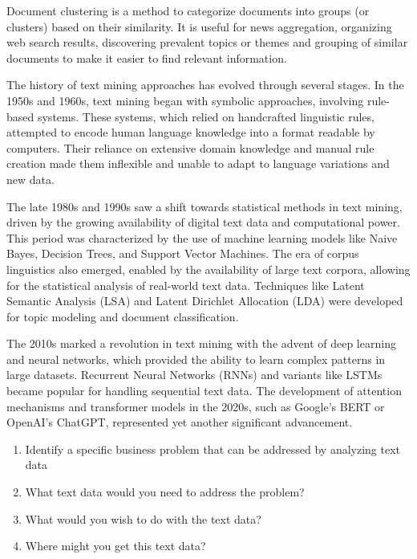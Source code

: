 Document clustering is a method to categorize documents into groups (or clusters) based on their similarity. It is useful for news aggregation, organizing web search results, discovering prevalent topics or themes and grouping of similar documents to make it easier to find relevant information.

The history of text mining approaches has evolved through several stages. In the 1950s and 1960s, text mining began with symbolic approaches, involving rule-based systems. These systems, which relied on handcrafted linguistic rules, attempted to encode human language knowledge into a format readable by computers. Their reliance on extensive domain knowledge and manual rule creation made them inflexible and unable to adapt to language variations and new data.

The late 1980s and 1990s saw a shift towards statistical methods in text mining, driven by the growing availability of digital text data and computational power. This period was characterized by the use of machine learning models like Naive Bayes, Decision Trees, and Support Vector Machines. The era of corpus linguistics also emerged, enabled by the availability of large text corpora, allowing for the statistical analysis of real-world text data. Techniques like Latent Semantic Analysis (LSA) and Latent Dirichlet Allocation (LDA) were developed for topic modeling and document classification. 

The 2010s marked a revolution in text mining with the advent of deep learning and neural networks, which provided the ability to learn complex patterns in large datasets. Recurrent Neural Networks (RNNs) and variants like LSTMs became popular for handling sequential text data. The development of attention mechanisms and transformer models in the 2020s, such as Google's BERT or OpenAI's ChatGPT, represented yet another significant advancement.

\begin{exerciseboxpaper}
 
\begin{enumerate}
	\item Identify a specific business problem that can be addressed by analyzing text data
	\item What text data would you need to address the problem?
	\item What would you wish to do with the text data?
	\item Where might you get this text data?
\end{enumerate}
\end{exerciseboxpaper}

